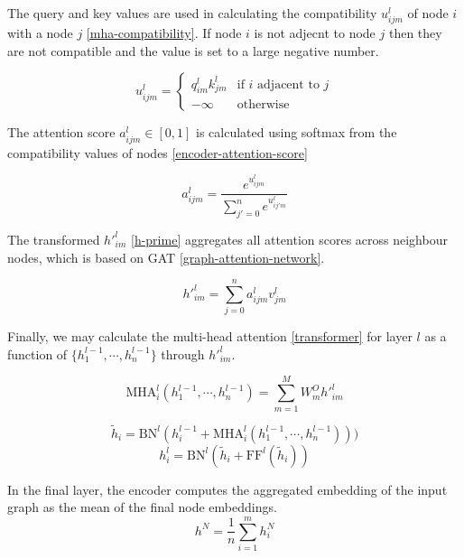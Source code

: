     The query and key values are used in calculating the compatibility $u_{ijm}^l$ of node $i$ with a node $j$ \ref{mha-compatibility}. If node $i$ is not adjecnt to node $j$ then they are not compatible and the value is set to a large negative number.
    
    \begin{equation}\label{mha-compatibility}
        u_{ijm}^l = \begin{cases} q_{im}^l k_{jm}^l &\mbox{if $i$ adjacent to $j$} \\ -\infty &\mbox{otherwise} \end{cases}
    \end{equation}
    
    The attention score $a_{ijm}^l \in [0,1]$ is calculated using softmax from the compatibility values of nodes \ref{encoder-attention-score}
    
    \begin{equation}\label{encoder-attention-score}
        a_{ijm}^l = \dfrac{e^{u_{ijm}^l}}{\sum_{j'=0}^n e^{u_{ij'm}^l}}
    \end{equation}
    
    The transformed $h'_{im}^l$ \ref{h-prime} aggregates all attention scores across neighbour nodes, which is based on GAT \ref{graph-attention-network}. 

    \begin{equation}\label{h-prime}
        h'_{im}^l = \sum_{j=0}^n a_{ijm}^l v_{jm}^l
    \end{equation}
    
    Finally, we may calculate the multi-head attention \ref{transformer} for layer $l$ as a function of $\{h_1^{l-1}, \cdots, h_n^{l-1}\}$ through $h'_{im}^l$.
    
    \begin{equation}
        \text{MHA}_i^l(h_1^{l-1}, \cdots, h_n^{l-1}) = \sum_{m=1}^M W_{m}^O h'_{im}^l
    \end{equation}
    
    \begin{equation}
        \widetilde{h}_i = \text{BN}^l(h_i^{l-1} + \text{MHA}_i^l(h_1^{l-1}, \cdots, h_n^{l-1})))
    \end{equation}    
    \begin{equation}
        h_i^l = \text{BN}^l(\widetilde{h}_i + \text{FF}^l(\widetilde{h}_i))
    \end{equation}
    
    In the final layer, the encoder computes the aggregated embedding of the input graph as the mean of the final node embeddings.
    \begin{equation}
        h^N = \dfrac{1}{n} \sum_{i=1}^m h_i^N
    \end{equation}
    
